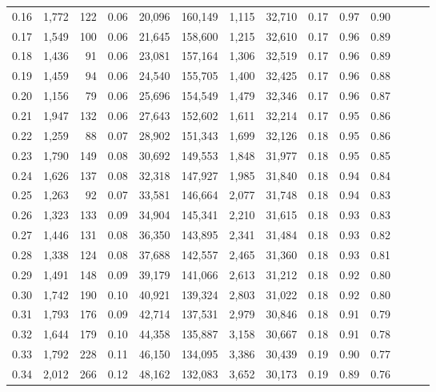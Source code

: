 \begin{tabular}{rrrrrrrrrrrrrr}
0.16 &  1,772 &  122 &  0.06 &   20,096 &  160,149 &   1,115 &  32,710 &  0.17 &  0.97 &      0.90 \\
0.17 &  1,549 &  100 &  0.06 &   21,645 &  158,600 &   1,215 &  32,610 &  0.17 &  0.96 &      0.89 \\
0.18 &  1,436 &   91 &  0.06 &   23,081 &  157,164 &   1,306 &  32,519 &  0.17 &  0.96 &      0.89 \\
0.19 &  1,459 &   94 &  0.06 &   24,540 &  155,705 &   1,400 &  32,425 &  0.17 &  0.96 &      0.88 \\
0.20 &  1,156 &   79 &  0.06 &   25,696 &  154,549 &   1,479 &  32,346 &  0.17 &  0.96 &      0.87 \\
0.21 &  1,947 &  132 &  0.06 &   27,643 &  152,602 &   1,611 &  32,214 &  0.17 &  0.95 &      0.86 \\
0.22 &  1,259 &   88 &  0.07 &   28,902 &  151,343 &   1,699 &  32,126 &  0.18 &  0.95 &      0.86 \\
0.23 &  1,790 &  149 &  0.08 &   30,692 &  149,553 &   1,848 &  31,977 &  0.18 &  0.95 &      0.85 \\
0.24 &  1,626 &  137 &  0.08 &   32,318 &  147,927 &   1,985 &  31,840 &  0.18 &  0.94 &      0.84 \\
0.25 &  1,263 &   92 &  0.07 &   33,581 &  146,664 &   2,077 &  31,748 &  0.18 &  0.94 &      0.83 \\
0.26 &  1,323 &  133 &  0.09 &   34,904 &  145,341 &   2,210 &  31,615 &  0.18 &  0.93 &      0.83 \\
0.27 &  1,446 &  131 &  0.08 &   36,350 &  143,895 &   2,341 &  31,484 &  0.18 &  0.93 &      0.82 \\
0.28 &  1,338 &  124 &  0.08 &   37,688 &  142,557 &   2,465 &  31,360 &  0.18 &  0.93 &      0.81 \\
0.29 &  1,491 &  148 &  0.09 &   39,179 &  141,066 &   2,613 &  31,212 &  0.18 &  0.92 &      0.80 \\
0.30 &  1,742 &  190 &  0.10 &   40,921 &  139,324 &   2,803 &  31,022 &  0.18 &  0.92 &      0.80 \\
0.31 &  1,793 &  176 &  0.09 &   42,714 &  137,531 &   2,979 &  30,846 &  0.18 &  0.91 &      0.79 \\
0.32 &  1,644 &  179 &  0.10 &   44,358 &  135,887 &   3,158 &  30,667 &  0.18 &  0.91 &      0.78 \\
0.33 &  1,792 &  228 &  0.11 &   46,150 &  134,095 &   3,386 &  30,439 &  0.19 &  0.90 &      0.77 \\
0.34 &  2,012 &  266 &  0.12 &   48,162 &  132,083 &   3,652 &  30,173 &  0.19 &  0.89 &      0.76 \\

\end{tabular}
